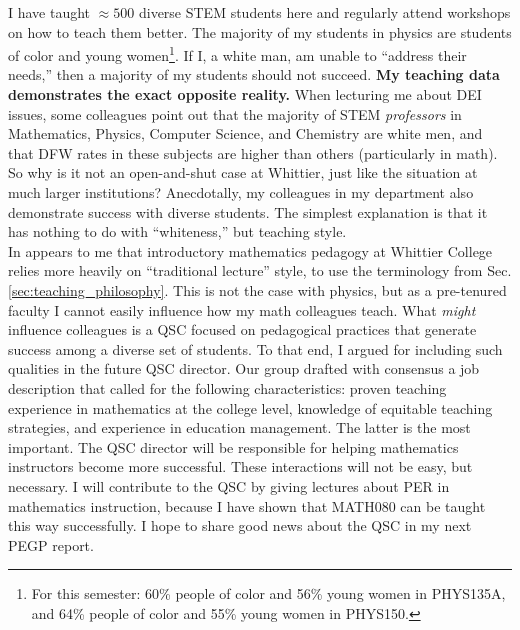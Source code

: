 \documentclass[../../../main.tex]{subfiles}
\begin{document}
I have taught $\approx 500$ diverse STEM students here and regularly attend workshops on how to teach them better.  The majority of my students in physics are students of color and young women\footnote{For this semester: 60\% people of color and 56\% young women in PHYS135A, and 64\% people of color and 55\% young women in PHYS150.}.  If I, a white man, am unable to ``address their needs,'' then a majority of my students should not succeed.  \textbf{My teaching data demonstrates the exact opposite reality.}  When lecturing me about DEI issues, some colleagues point out that the majority of STEM \textit{professors} in Mathematics, Physics, Computer Science, and Chemistry are white men, and that DFW rates in these subjects are higher than others (particularly in math).  So why is it not an open-and-shut case at Whittier, just like the situation at much larger institutions?  Anecdotally, my colleagues in my department also demonstrate success with diverse students.  The simplest explanation is that it has nothing to do with ``whiteness,'' but teaching style.
\\
\vspace{0.15cm}
In appears to me that introductory mathematics pedagogy at Whittier College relies more heavily on ``traditional lecture'' style, to use the terminology from Sec. \ref{sec:teaching_philosophy}.  This is not the case with physics, but as a pre-tenured faculty I cannot easily influence how my math colleagues teach.  What \textit{might} influence colleagues is a QSC focused on pedagogical practices that generate success among a diverse set of students.  To that end, I argued for including such qualities in the future QSC director.  Our group drafted with consensus a job description that called for the following characteristics: proven teaching experience in mathematics at the college level, knowledge of equitable teaching strategies, and experience in education management.  The latter is the most important.  The QSC director will be responsible for helping mathematics instructors become more successful.  These interactions will not be easy, but necessary.  I will contribute to the QSC by giving lectures about PER in mathematics instruction, because I have shown that MATH080 can be taught this way successfully.  I hope to share good news about the QSC in my next PEGP report.
\end{document}
